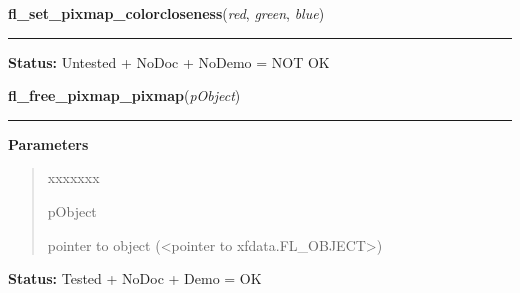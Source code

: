    \label{xformslib:library:fl_set_pixmap_colorcloseness}

    \vspace{0.5ex}

\hspace{.8\funcindent}\begin{boxedminipage}{\funcwidth}

    \raggedright \textbf{fl\_set\_pixmap\_colorcloseness}(\textit{red}, \textit{green}, \textit{blue})

    \vspace{-1.5ex}

    \rule{\textwidth}{0.5\fboxrule}
\setlength{\parskip}{2ex}
\setlength{\parskip}{1ex}
\textbf{Status:} Untested + NoDoc + NoDemo = NOT OK



    \end{boxedminipage}

    \label{xformslib:library:fl_free_pixmap_pixmap}

    \vspace{0.5ex}

\hspace{.8\funcindent}\begin{boxedminipage}{\funcwidth}

    \raggedright \textbf{fl\_free\_pixmap\_pixmap}(\textit{pObject})

    \vspace{-1.5ex}

    \rule{\textwidth}{0.5\fboxrule}
\setlength{\parskip}{2ex}
\setlength{\parskip}{1ex}
      \textbf{Parameters}
      \vspace{-1ex}

      \begin{quote}
        \begin{Ventry}{xxxxxxx}

          \item[pObject]

          pointer to object ({\textless}pointer to 
          xfdata.FL\_OBJECT{\textgreater})

        \end{Ventry}

      \end{quote}

\textbf{Status:} Tested + NoDoc + Demo = OK



    \end{boxedminipage}

